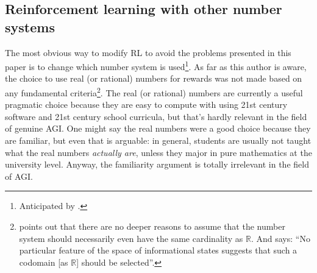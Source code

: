 \documentclass[twoside,11pt]{article}
\begin{document}

\subsection{Reinforcement learning with other number systems}

The most obvious way to modify RL to avoid the problems presented in this
paper is to change which number system is used\footnote{Anticipated
by \citet{rizza2016divergent}.}.
As far as this author is aware,
the choice to use real (or rational) numbers for rewards was not made based
on any fundamental criteria\footnote{\cite{niederee1992numbers} points out
that there are
no deeper reasons to assume that the number system should necessarily
even have the same cardinality as $\mathbb R$. And \cite{rizza2016divergent} says:
``No particular feature of the space of informational
states suggests that such a codomain [as $\mathbb R$] should be selected''.}. The real
(or rational) numbers are currently a
useful pragmatic choice because they are easy to compute with using 21st
century software and 21st century school curricula, but that's hardly relevant
in the field of genuine AGI. One might
say the real numbers were a good choice because they are familiar, but even
that is arguable: in general, students are usually not taught what the
real numbers \emph{actually are},
unless they major in pure mathematics at the university level. Anyway,
the familiarity argument is totally irrelevant in the field of AGI.
\end{document}
